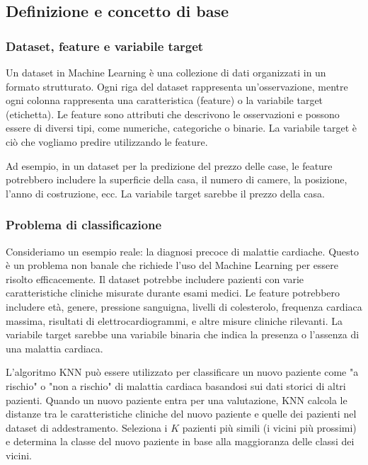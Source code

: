 \subsection{Definizione e concetto di base}

\subsubsection{Dataset, feature e variabile target}

Un dataset in Machine Learning è una collezione di dati organizzati in un formato strutturato. Ogni riga del dataset rappresenta un'osservazione, mentre ogni colonna rappresenta una caratteristica (feature) o la variabile target (etichetta). Le feature sono attributi che descrivono le osservazioni e possono essere di diversi tipi, come numeriche, categoriche o binarie. La variabile target è ciò che vogliamo predire utilizzando le feature.

Ad esempio, in un dataset per la predizione del prezzo delle case, le feature potrebbero includere la superficie della casa, il numero di camere, la posizione, l'anno di costruzione, ecc. La variabile target sarebbe il prezzo della casa.

\subsubsection{Problema di classificazione}

Consideriamo un esempio reale: la diagnosi precoce di malattie cardiache. Questo è un problema non banale che richiede l'uso del Machine Learning per essere risolto efficacemente. Il dataset potrebbe includere pazienti con varie caratteristiche cliniche misurate durante esami medici. Le feature potrebbero includere età, genere, pressione sanguigna, livelli di colesterolo, frequenza cardiaca massima, risultati di elettrocardiogrammi, e altre misure cliniche rilevanti. La variabile target sarebbe una variabile binaria che indica la presenza o l'assenza di una malattia cardiaca.

L'algoritmo KNN può essere utilizzato per classificare un nuovo paziente come "a rischio" o "non a rischio" di malattia cardiaca basandosi sui dati storici di altri pazienti. Quando un nuovo paziente entra per una valutazione, KNN calcola le distanze tra le caratteristiche cliniche del nuovo paziente e quelle dei pazienti nel dataset di addestramento. Seleziona i \( K \) pazienti più simili (i vicini più prossimi) e determina la classe del nuovo paziente in base alla maggioranza delle classi dei vicini.

